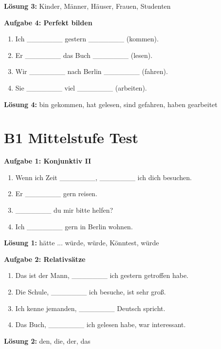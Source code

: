 \bigskip
\textbf{Lösung 3:} Kinder, Männer, Häuser, Frauen, Studenten

\bigskip
\noindent\textbf{Aufgabe 4: Perfekt bilden}

\begin{enumerate}
    \item Ich \_\_\_\_\_\_\_ gestern \_\_\_\_\_\_\_ (kommen).
    \item Er \_\_\_\_\_\_\_ das Buch \_\_\_\_\_\_\_ (lesen).
    \item Wir \_\_\_\_\_\_\_ nach Berlin \_\_\_\_\_\_\_ (fahren).
    \item Sie \_\_\_\_\_\_\_ viel \_\_\_\_\_\_\_ (arbeiten).
\end{enumerate}

\bigskip
\textbf{Lösung 4:} bin gekommen, hat gelesen, sind gefahren, haben gearbeitet

\section{B1 Mittelstufe Test}

\bigskip
\noindent\textbf{Aufgabe 1: Konjunktiv II}

\begin{enumerate}
    \item Wenn ich Zeit \_\_\_\_\_\_\_, \_\_\_\_\_\_\_ ich dich besuchen.
    \item Er \_\_\_\_\_\_\_ gern reisen.
    \item \_\_\_\_\_\_\_ du mir bitte helfen?
    \item Ich \_\_\_\_\_\_\_ gern in Berlin wohnen.
\end{enumerate}

\bigskip
\textbf{Lösung 1:} hätte ... würde, würde, Könntest, würde

\bigskip
\noindent\textbf{Aufgabe 2: Relativsätze}

\begin{enumerate}
    \item Das ist der Mann, \_\_\_\_\_\_\_ ich gestern getroffen habe.
    \item Die Schule, \_\_\_\_\_\_\_ ich besuche, ist sehr groß.
    \item Ich kenne jemanden, \_\_\_\_\_\_\_ Deutsch spricht.
    \item Das Buch, \_\_\_\_\_\_\_ ich gelesen habe, war interessant.
\end{enumerate}

\bigskip
\textbf{Lösung 2:} den, die, der, das


